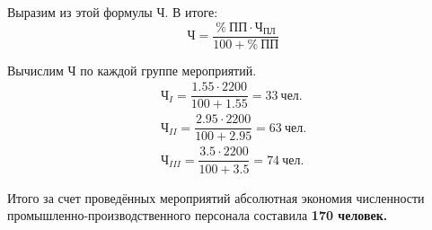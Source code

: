 Выразим из этой формулы Ч. В итоге:
\begin{equation}
\text{Ч} = \dfrac{\% ~ \text{ПП} \cdot \text{Ч}_{\text{ПЛ}}}{100 + \% ~ \text{ПП}}
\end{equation}

Вычислим Ч по каждой группе мероприятий.
\begin{align}
  \text{Ч}_{I} = \dfrac{1.55 \cdot 2200}{100 + 1.55} = 33 ~ \text{чел.} \\
  \text{Ч}_{II} = \dfrac{2.95 \cdot 2200}{100 + 2.95} = 63 ~ \text{чел.} \\
  \text{Ч}_{III} = \dfrac{3.5 \cdot 2200}{100 + 3.5} = 74 ~ \text{чел.}
\end{align}

Итого за счет проведённых мероприятий абсолютная экономия численности
промышленно-производственного персонала составила \textbf{170 человек.}

\newpage
